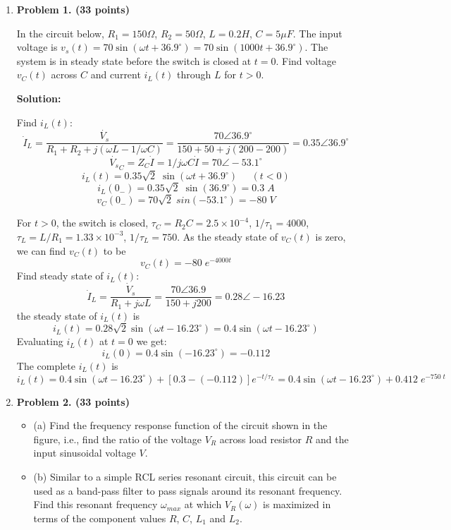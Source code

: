 \begin{enumerate}

\item {\bf Problem 1. (33 points)} 

In the circuit below, $R_1=150\Omega$, $R_2=50\Omega$, $L=0.2H$, $C=5\mu F$.
The input voltage is $v_s(t)=70\sin(\omega t+36.9^\circ)=70\sin(1000 t+36.9^\circ)$.
The system is in steady state before the switch is closed at $t=0$. Find voltage 
$v_C(t)$ across $C$ and current $i_L(t)$ through $L$ for $t>0$.


{\bf Solution:} 

Find $i_L(t)$:
\[ \dot{I}_L=\frac{\dot{V_s}}{R_1+R_2+j(\omega L-1/\omega C)}
=\frac{70\angle 36.9^\circ}{150+50+j(200-200)}=0.35\angle 36.9^\circ \]
\[ \dot{V_s}_C=Z_C \dot{I}=1/j\omega C \dot{I}=70\angle -53.1^\circ \]
\[ i_L(t)=0.35\sqrt{2}\;\sin(\omega t+36.9^\circ)\;\;\;\;\;(t<0) \]
\[ i_L(0_-)=0.35\sqrt{2}\;\sin(36.9^\circ)=0.3\;A \]
\[ v_C(0_-)=70\sqrt{2}\;sin(-53.1^\circ)=-80\;V \]

For $t>0$, the switch is closed, $\tau_C=R_2C=2.5\times 10^{-4}$, 
$1/\tau_1=4000$, $\tau_L=L/R_1=1.33\times 10^{-3}$, $1/\tau_L=750$.
As the steady state of $v_C(t)$ is zero, we can find $v_C(t)$ to be
\[ v_C(t)=-80\;e^{-4000  t} \]
Find steady state of $i_L(t)$:
\[ \dot{I}_L=\frac{\dot{V}_s}{R_1+j\omega L}=\frac{70\angle 36.9}{150+j200}
=0.28\angle -16.23 \]
the steady state of $i_L(t)$ is
\[ i_L(t)=0.28\sqrt{2}\sin(\omega t-16.23^\circ)=0.4\sin(\omega t-16.23^\circ) \]
Evaluating $i_L(t)$ at $t=0$ we get:
\[ i_L(0)=0.4\sin(-16.23^\circ)=-0.112 \]
The complete $i_L(t)$ is
\[ i_L(t)=0.4\sin(\omega t-16.23^\circ)+[0.3-(-0.112)]e^{-t/\tau_L}
=0.4\sin(\omega t-16.23^\circ)+0.412\;e^{-750\;t} \]


\item {\bf Problem 2. (33 points)} 

\begin{itemize}
\item (a) Find the frequency response function of the circuit shown in 
the figure, i.e., find the ratio of the voltage $V_R$ across load resistor
$R$ and the input sinusoidal voltage $V$. 

\item (b) Similar to a simple RCL series resonant circuit, this circuit
can be used as a band-pass filter to pass signals around its resonant 
frequency. Find this resonant frequency $\omega_{max}$ at which 
$V_R(\omega)$ is maximized in terms of the component values $R$, $C$, 
$L_1$ and $L_2$. 


\end{itemize}
\end{enumerate}
